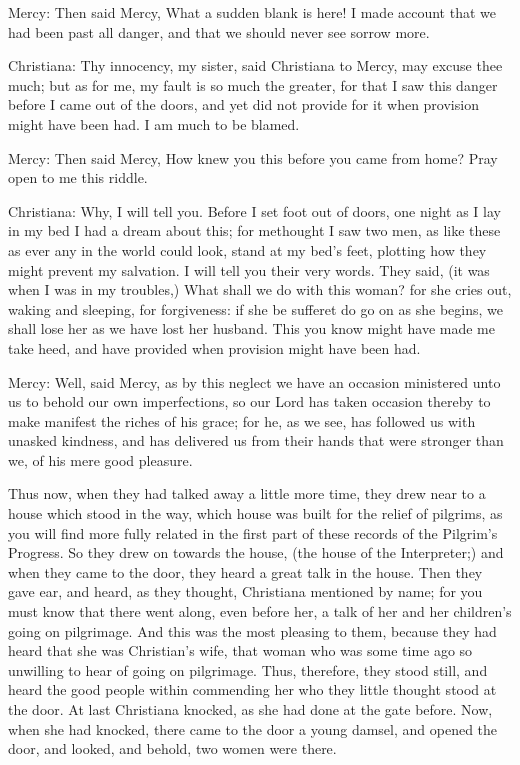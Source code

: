 Mercy: Then said Mercy, What a sudden blank is here! I made account that we had been past all danger, and that we should never see sorrow more.

Christiana: Thy innocency, my sister, said Christiana to Mercy, may excuse thee much; but as for me, my fault is so much the greater, for that I saw this danger before I came out of the doors, and yet did not provide for it when provision might have been had. I am much to be blamed.

Mercy: Then said Mercy, How knew you this before you came from home? Pray open to me this riddle.

Christiana: Why, I will tell you. Before I set foot out of doors, one night as I lay in my bed I had a dream about this; for methought I saw two men, as like these as ever any in the world could look, stand at my bed's feet, plotting how they might prevent my salvation. I will tell you their very words. They said, (it was when I was in my troubles,) What shall we do with this woman? for she cries out, waking and sleeping, for forgiveness: if she be sufferet do go on as she begins, we shall lose her as we have lost her husband. This you know might have made me take heed, and have provided when provision might have been had.

Mercy: Well, said Mercy, as by this neglect we have an occasion ministered unto us to behold our own imperfections, so our Lord has taken occasion thereby to make manifest the riches of his grace; for he, as we see, has followed us with unasked kindness, and has delivered us from their hands that were stronger than we, of his mere good pleasure.

Thus now, when they had talked away a little more time, they drew near to a house which stood in the way, which house was built for the relief of pilgrims, as you will find more fully related in the first part of these records of the Pilgrim's Progress. So they drew on towards the house, (the house of the Interpreter;) and when they came to the door, they heard a great talk in the house. Then they gave ear, and heard, as they thought, Christiana mentioned by name; for you must know that there went along, even before her, a talk of her and her children's going on pilgrimage. And this was the most pleasing to them, because they had heard that she was Christian's wife, that woman who was some time ago so unwilling to hear of going on pilgrimage. Thus, therefore, they stood still, and heard the good people within commending her who they little thought stood at the door. At last Christiana knocked, as she had done at the gate before. Now, when she had knocked, there came to the door a young damsel, and opened the door, and looked, and behold, two women were there.

